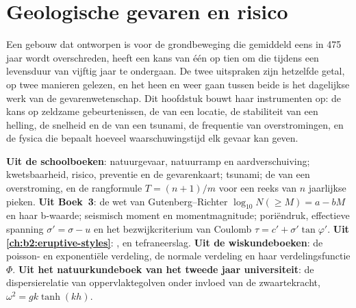 \chapter{Geologische gevaren en risico}\label{ch:b2:geological-hazards}

Een gebouw dat ontworpen is voor de grondbeweging die gemiddeld eens in 475 jaar wordt overschreden, heeft een
kans van één op tien om die tijdens een levensduur van vijftig jaar te ondergaan. De twee uitspraken zijn hetzelfde getal,
op twee manieren gelezen, en het heen en weer gaan tussen beide is het dagelijkse werk van de gevarenwetenschap. Dit hoofdstuk
bouwt haar instrumenten op: de kans op zeldzame gebeurtenissen, de  van een locatie, de stabiliteit van een
helling, de snelheid en de  van een tsunami, de frequentie van overstromingen, en de fysica die bepaalt
hoeveel waarschuwingstijd elk gevaar kan geven.

\begin{recall}
\textbf{Uit de schoolboeken}: natuurgevaar, natuurramp en aardverschuiving; kwetsbaarheid,
risico, preventie en de gevarenkaart; tsunami; de  van een overstroming, en de rangformule
$T = (n + 1)/m$ voor een reeks van $n$ jaarlijkse pieken. \textbf{Uit Boek~3}: de
wet van Gutenberg--Richter $\log_{10} N(\geq M) = a - bM$ en haar b-waarde; seismisch moment en
momentmagnitude; poriëndruk, effectieve spanning $\sigma' = \sigma - u$ en het
bezwijkcriterium van Coulomb $\tau = c' + \sigma' \tan\varphi'$. \textbf{Uit \cref{ch:b2:eruptive-styles}}: ,  en tefraneerslag. \textbf{Uit de wiskundeboeken}: de poisson- en
exponentiële verdeling, de normale verdeling en haar verdelingsfunctie $\Phi$.
\textbf{Uit het natuurkundeboek van het tweede jaar universiteit}: de dispersierelatie van oppervlaktegolven onder invloed van de zwaartekracht,
$\omega^2 = gk\tanh(kh)$.
\end{recall}

